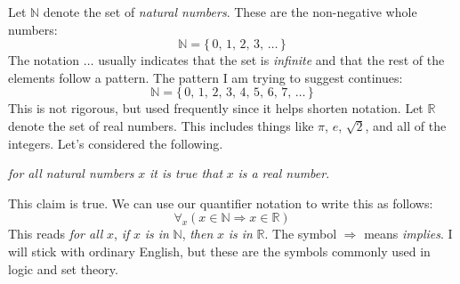             \begin{example}
                Let $\mathbb{N}$ denote the set of \textit{natural numbers}.
                These are the non-negative whole numbers:
                \begin{equation}
                    \mathbb{N}=\{\,0,\,1,\,2,\,3,\,\dots\,\}
                \end{equation}
                The notation $\dots$ usually indicates that the set is
                \textit{infinite} and that the rest of the elements follow a
                pattern. The pattern I am trying to suggest continues:
                \begin{equation}
                    \mathbb{N}=\{\,0,\,1,\,2,\,3,\,4,\,5,\,6,\,7,\,\dots\,\}
                \end{equation}
                This is not rigorous, but used frequently since it helps
                shorten notation. Let $\mathbb{R}$ denote the set of real
                numbers. This includes things like $\pi$, $e$, $\sqrt{2}$, and
                all of the integers. Let's considered the following.
                \begin{center}
                    \textit{for all natural numbers} $x$
                    \textit{it is true that} $x$ \textit{is a real number}.
                \end{center}
                This claim is true. We can use our quantifier notation to write
                this as follows:
                \begin{equation}
                    \forall_{x}(x\in\mathbb{N}\Rightarrow{x}\in\mathbb{R})
                \end{equation}
                This reads \textit{for all} $x$, \textit{if} $x$
                \textit{is in} $\mathbb{N}$, \textit{then} $x$
                \textit{is in} $\mathbb{R}$. The symbol $\Rightarrow$ means
                \textit{implies}. I will stick with ordinary English, but these
                are the symbols commonly used in logic and set theory.
            \end{example}
